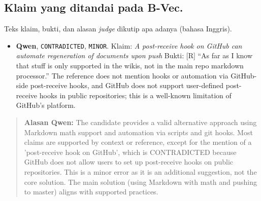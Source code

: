 \subsection{Klaim yang ditandai pada B-Vec.} Teks klaim, bukti, dan alasan \emph{judge} dikutip apa adanya (bahasa Inggris).
\begin{itemize}\small
\item \textbf{Qwen}, \texttt{CONTRADICTED}, \texttt{MINOR}. Klaim: \emph{A post-receive hook on GitHub can automate regeneration of documents upon push} Bukti: [R] “As far as I know that stuff is only supported in the wikis, not in the main repo markdown processor.” The reference does not mention hooks or automation via GitHub-side post-receive hooks, and GitHub does not support user-defined post-receive hooks in public repositories; this is a well-known limitation of GitHub's platform.
\end{itemize}
\begin{quote}\small\textbf{Alasan Qwen:} The candidate provides a valid alternative approach using Markdown math support and automation via scripts and git hooks. Most claims are supported by context or reference, except for the mention of a 'post-receive hook on GitHub', which is CONTRADICTED because GitHub does not allow users to set up post-receive hooks on public repositories. This is a minor error as it is an additional suggestion, not the core solution. The main solution (using Markdown with math and pushing to master) aligns with supported practices.\end{quote}
